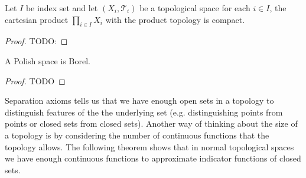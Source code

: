 \begin{thm}\label{Tychonoff}Let $I$ be index set
  and let $(X_i,
  \mathcal{T}_i)$ be a topological space for each $i \in I$, the
  cartesian product $\prod_{i \in I} X_i$ with the product topology is
  compact.
\end{thm}
\begin{proof}
TODO:
\end{proof}

\begin{thm}\label{PolishImpliesBorel}A Polish space is Borel.
\end{thm}
\begin{proof}
TODO
\end{proof}

Separation axioms tells us that we have enough open sets in a topology
to distinguish features of the the underlying set (e.g. distinguishing
points from points or closed sets from closed sets).  Another way of
thinking about the size of a topology is by considering the number of
continuous functions that the topology allows.  The following theorem
shows that in normal topological spaces we have enough continuous
functions to approximate indicator functions of closed sets.

